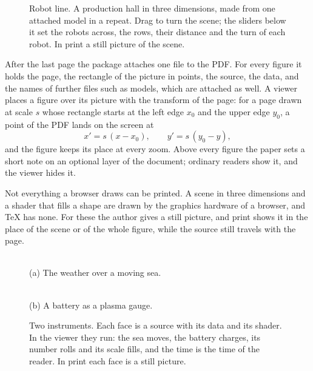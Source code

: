 \documentclass[10pt,twocolumn]{article}
\newcommand\figurehint{%
  \par\vspace{4pt}\hfill\sflhint[\textcolor{hint}{\itshape\footnotesize Interactive figure: open this PDF with the stickyflow
  extension}]\par\smallskip}
\begin{document}
\begin{figure}[t]
\figurehint
\centering
{}
\caption{Robot line. A production hall in three dimensions, made from one attached model in a repeat. Drag to turn the scene; the
sliders below it set the robots across, the rows, their distance and the turn of each robot. In print a still picture of the scene.}
\label{fig:robots}
\end{figure}

After the last page the package attaches one file to the PDF. For every figure it holds the page, the rectangle of the picture in
points, the source, the data, and the names of further files such as models, which are attached as well. A viewer places a figure over
its picture with the transform of the page: for a page drawn at scale $s$ whose rectangle starts at the left edge $x_0$ and the upper
edge $y_0$, a point of the PDF lands on the screen at
\begin{equation}
  x' = s\,(x - x_0), \qquad y' = s\,(y_0 - y) ,
  \label{eq:place}
\end{equation}
and the figure keeps its place at every zoom. Above every figure the paper sets a short note on an optional layer of the document;
ordinary readers show it, and the viewer hides it.

Not everything a browser draws can be printed. A scene in three dimensions and a shader that fills a shape are drawn by the graphics
hardware of a browser, and TeX has none. For these the author gives a still picture, and print shows it in the place of the scene or of
the whole figure, while the source still travels with the page.

\begin{figure}[t]
\vspace{10pt}
\figurehint
\centering
\begin{minipage}[t]{0.3\textwidth}
\centering
{}\\[6pt]
{\small (a) The weather over a moving sea.}
\end{minipage}\hspace{0.1\textwidth}%
\begin{minipage}[t]{0.3\textwidth}
\centering
{}\\[6pt]
{\small (b) A battery as a plasma gauge.}
\end{minipage}
\caption{Two instruments. Each face is a source with its data and its shader. In the viewer they run: the sea moves, the battery
charges, its number rolls and its scale fills, and the time is the time of the reader. In print each face is a still picture.}
\label{fig:watches}
\end{figure}
\end{document}
